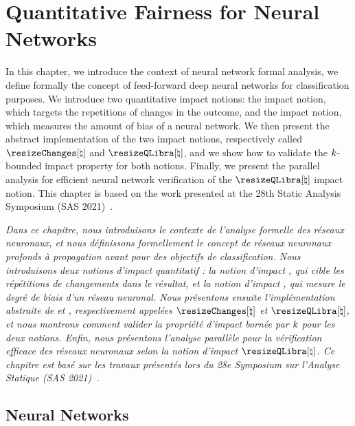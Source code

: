 \chapter{Quantitative Fairness for Neural Networks}

In this chapter, we introduce the context of neural network formal analysis, we define formally the concept of feed-forward deep neural networks for classification purposes.
We introduce two quantitative impact notions: the \changesname{} impact notion, which targets the repetitions of changes in the outcome, and the \qlibraname{} impact notion, which measures the amount of bias of a neural network. We then present the abstract implementation of the two impact notions, respectively called $\abstractchangesname$ and $\abstractqlibraname$, and we show how to validate the $k$-bounded impact property for both notions. Finally, we present the parallel analysis for efficient neural network verification of the $\abstractqlibraname$ impact notion.
This chapter is based on the work presented at the 28th Static Analysis Symposium (SAS 2021)~\cite{Mazzucato2021}.

\emph{Dans ce chapitre, nous introduisons le contexte de l'analyse formelle des réseaux neuronaux, et nous définissons formellement le concept de réseaux neuronaux profonds à propagation avant pour des objectifs de classification.
Nous introduisons deux notions d'impact quantitatif : la notion d'impact \changesname{}, qui cible les répétitions de changements dans le résultat, et la notion d'impact \qlibraname{}, qui mesure le degré de biais d'un réseau neuronal. Nous présentons ensuite l'implémentation abstraite de \changesname{} et \qlibraname{}, respectivement appelées $\abstractchangesname$ et $\abstractqlibraname$, et nous montrons comment valider la propriété d'impact bornée par $k$ pour les deux notions. Enfin, nous présentons l'analyse parallèle pour la vérification efficace des réseaux neuronaux selon la notion d'impact $\abstractqlibraname$.
Ce chapitre est basé sur les travaux présentés lors du 28e Symposium sur l'Analyse Statique (SAS 2021)~.}

% 
% 
% 
% 
% 

\section{Neural Networks}

